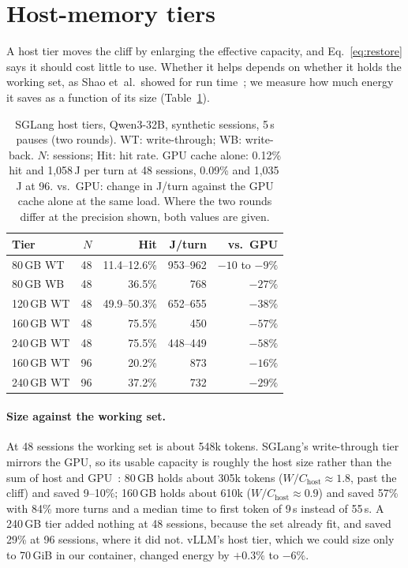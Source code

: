 \section{Host-memory tiers}
\label{sec:tiers}

A host tier moves the cliff by enlarging the effective capacity, and Eq.~\eqref{eq:restore} says it should cost little
to use. Whether it helps depends on whether it holds the working set, as Shao et~al.\ showed for
run time~\cite{shao2026efficientagent}; we measure how much energy it saves as a function of its size
(Table~\ref{tab:tiers}).

\begin{table}[t]
\centering\small
\caption{SGLang host tiers, Qwen3-32B, synthetic sessions, 5\,s pauses (two rounds). WT: write-through; WB: write-back. $N$: sessions; Hit: hit rate. GPU cache alone:
0.12\% hit and 1,058\,J per turn at 48 sessions, 0.09\% and 1,035\,J at 96. vs.\ GPU: change in J/turn against the GPU cache alone at the same load. Where the two rounds differ at the precision shown, both values are given.}
\label{tab:tiers}
\begin{tabular}{lrrrr}
\toprule
Tier & $N$ & Hit & J/turn & vs.\ GPU \\
\midrule
80\,GB WT & 48 & 11.4--12.6\% & 953--962 & $-10$ to $-9\%$ \\
80\,GB WB & 48 & 36.5\% & 768 & $-27\%$ \\
120\,GB WT & 48 & 49.9--50.3\% & 652--655 & $-38\%$ \\
160\,GB WT & 48 & 75.5\% & 450 & $-57\%$ \\
240\,GB WT & 48 & 75.5\% & 448--449 & $-58\%$ \\
160\,GB WT & 96 & 20.2\% & 873 & $-16\%$ \\
240\,GB WT & 96 & 37.2\% & 732 & $-29\%$ \\
\bottomrule
\end{tabular}
\end{table}

\paragraph{Size against the working set.}\enlargethispage{\baselineskip} At 48 sessions the working set is about 548k tokens. SGLang's write-through
tier mirrors the GPU, so its usable capacity is roughly the host size rather than the sum of host and
GPU~\cite{lu2026metastability}: 80\,GB holds about 305k tokens ($W/C_{\text{host}}\approx1.8$, past the cliff) and saved 9--10\%; 160\,GB
holds about 610k ($W/C_{\text{host}}\approx0.9$) and saved 57\% with 84\% more turns and a median time to first token of 9\,s
instead of 55\,s. A 240\,GB tier added nothing at 48 sessions, because the set already fit, and saved 29\% at 96
sessions, where it did not. vLLM's host tier, which we could size only to 70\,GiB in our container, changed energy by $+0.3\%$ to $-6\%$.

